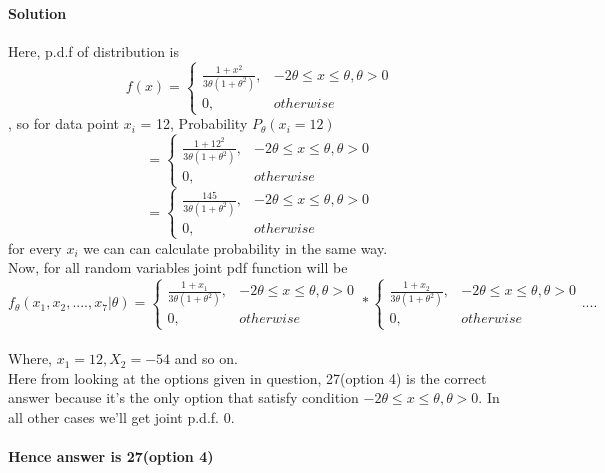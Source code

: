 \documentclass{article}
\begin{document}
\paragraph{Solution}
Here, p.d.f of distribution is \[
    f(x)= 
\begin{cases}
\frac{1 + x^2}{3\theta(1+\theta^2)},& -2\theta \leq x \leq \theta, \theta > 0\\
    0,              & otherwise
\end{cases}
\], so for data point \(x_i\) = 12, Probability \(P_\theta(x_i = 12)\)  \[= \begin{cases}
\frac{1 + 12^2}{3\theta(1+\theta^2)},& -2\theta \leq x \leq \theta, \theta > 0\\
    0,              & otherwise
\end{cases}
\]
\[= \begin{cases}
\frac{145}{3\theta(1+\theta^2)},& -2\theta \leq x \leq \theta, \theta > 0\\
    0,              & otherwise
\end{cases}
\] 
for every \(x_i\) we can can calculate probability in the same way. \\
Now, for all random variables joint pdf function will be 
\[f_\theta(x_1,x_2,....,x_7 | \theta)= \begin{cases}
\frac{1 + x_1}{3\theta(1+\theta^2)},& -2\theta \leq x \leq \theta, \theta > 0\\
    0,              & otherwise
\end{cases} * \begin{cases}
\frac{1 + x_2}{3\theta(1+\theta^2)},& -2\theta \leq x \leq \theta, \theta > 0\\
    0,              & otherwise
\end{cases} ....
\] 
\\ 
Where, \(x_1 = 12, X_2 = -54\) and so on.
\\ Here from looking at the options given in question, 27(option 4) is the correct answer because it's the only option that satisfy condition \(-2\theta \leq x \leq \theta , \theta > 0\). In all other cases we'll get joint p.d.f. 0.
\\\paragraph{}
\textbf{Hence answer is 27(option 4)}
\end{document}
